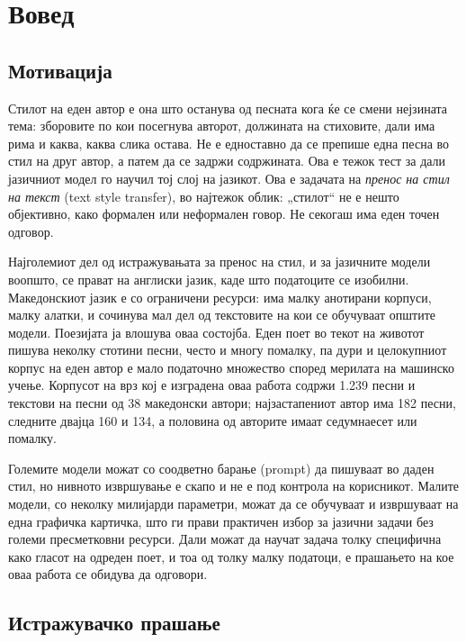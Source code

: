 \chapter{Вовед}\label{ch:intro}

\section{Мотивација}

Стилот на еден автор е она што останува од песната кога ќе се смени нејзината
тема: зборовите по кои посегнува авторот, должината на стиховите, дали
има рима и каква, каква слика остава. Не е едноставно да се препише една песна во стил на друг автор, а патем да се задржи содржината. Ова е тежок тест за дали јазичниот модел го научил тој слој на јазикот. Ова е задачата на \emph{пренос на стил на текст} (text style transfer), во најтежок облик: „стилот“ не е нешто објективно, како формален или неформален говор. Не секогаш има еден точен одговор.

Најголемиот дел од истражувањата за пренос на стил, и за јазичните модели
воопшто, се прават на англиски јазик, каде што податоците се изобилни.
Македонскиот јазик е со ограничени ресурси: има малку анотирани корпуси,
малку алатки, и сочинува мал дел од текстовите на кои се обучуваат
општите модели. Поезијата ја влошува оваа состојба. Еден поет во текот на
животот пишува неколку стотини песни, често и многу помалку, па дури и
целокупниот корпус на еден автор е мало податочно множество според мерилата
на машинско учење. Корпусот на врз кој е изградена оваа работа содржи 1.239 
песни и текстови на песни од 38 македонски автори; најзастапениот автор
има 182 песни, следните двајца 160 и 134, а половина од авторите имаат
седумнаесет или помалку.

Големите модели можат со соодветно барање (prompt) да пишуваат во даден
стил, но нивното извршување е скапо и не е под контрола на корисникот.
Малите модели, со неколку милијарди параметри, можат да се обучуваат и
извршуваат на една графичка картичка, што ги прави практичен избор за
јазични задачи без големи пресметковни ресурси. Дали можат да научат
задача толку специфична како гласот на одреден поет, и тоа од толку малку
податоци, е прашањето на кое оваа работа се обидува да одговори.

\section{Истражувачко прашање}

